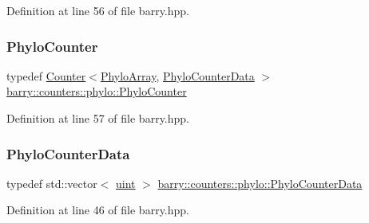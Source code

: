 Definition at line 56 of file barry.\+hpp.

\mbox{\label{namespacebarry_1_1counters_1_1phylo_a6523924ce3465c5b212584c57664f953}} 
\subsubsection{\texorpdfstring{Phylo\+Counter}{PhyloCounter}}
{\footnotesize\ttfamily typedef \hyperlink{classbarry_1_1_counter}{Counter}$<$\hyperlink{namespacebarry_1_1counters_1_1phylo_abd293bf65e494e903639fb5fb2c91604}{Phylo\+Array}, \hyperlink{namespacebarry_1_1counters_1_1phylo_a6ecc0d8ab76f8dc2db152221a8e9e95a}{Phylo\+Counter\+Data} $>$ \hyperlink{namespacebarry_1_1counters_1_1phylo_a6523924ce3465c5b212584c57664f953}{barry\+::counters\+::phylo\+::\+Phylo\+Counter}}



Definition at line 57 of file barry.\+hpp.

\mbox{\label{namespacebarry_1_1counters_1_1phylo_a6ecc0d8ab76f8dc2db152221a8e9e95a}} 
\subsubsection{\texorpdfstring{Phylo\+Counter\+Data}{PhyloCounterData}}
{\footnotesize\ttfamily typedef std\+::vector$<$ \hyperlink{namespacebarry_a11dfc53ddb4672278319aa04f1e09a6c}{uint} $>$ \hyperlink{namespacebarry_1_1counters_1_1phylo_a6ecc0d8ab76f8dc2db152221a8e9e95a}{barry\+::counters\+::phylo\+::\+Phylo\+Counter\+Data}}



Definition at line 46 of file barry.\+hpp.

\mbox{\label{namespacebarry_1_1counters_1_1phylo_a4e401ffe66d04091343dcffaf915f8c3}} 
